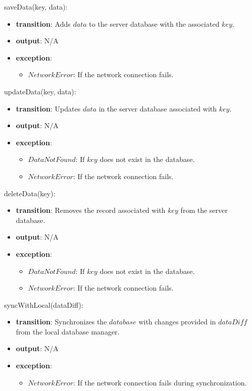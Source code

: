 \documentclass[12pt, titlepage]{article}
\begin{document}
\noindent saveData(key, data):
\begin{itemize}
  \item \textbf{transition}:
        Adds \( data \) to the server database with the associated \( key \).
  \item \textbf{output}: N/A
  \item \textbf{exception}:
        \begin{itemize}
          \item \( NetworkError \): If the network connection fails.
        \end{itemize}
\end{itemize}

\noindent updateData(key, data):
\begin{itemize}
  \item \textbf{transition}:
        Updates \( data \) in the server database associated with \( key \).
  \item \textbf{output}: N/A
  \item \textbf{exception}:
        \begin{itemize}
          \item \( DataNotFound \): If \( key \) does not exist in the database.
          \item \( NetworkError \): If the network connection fails.
        \end{itemize}
\end{itemize}

\noindent deleteData(key):
\begin{itemize}
  \item \textbf{transition}:
        Removes the record associated with \( key \) from the server database.
  \item \textbf{output}: N/A
  \item \textbf{exception}:
        \begin{itemize}
          \item \( DataNotFound \): If \( key \) does not exist in the database.
          \item \( NetworkError \): If the network connection fails.
        \end{itemize}
\end{itemize}

\noindent syncWithLocal(dataDiff):
\begin{itemize}
  \item \textbf{transition}:
        Synchronizes the \( database \) with changes provided in \( dataDiff \) from the local database manager.
  \item \textbf{output}: N/A
  \item \textbf{exception}:
        \begin{itemize}
          \item \( NetworkError \): If the network connection fails during synchronization.
        \end{itemize}
\end{itemize}
\end{document}
